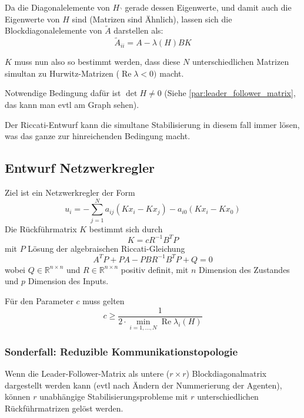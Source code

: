 Da die Diagonalelemente von $H_\urcorner$ gerade dessen Eigenwerte, und damit auch die
Eigenwerte von $H$ sind (Matrizen sind Ähnlich), lassen sich die Blockdiagonalelemente von
$\tilde{A}$ darstellen als:
\begin{equation}
    \tilde{A}_{ii} = A-\lambda(H)BK
\end{equation}

$K$ muss nun also so bestimmt werden, dass diese $N$ unterschiedlichen Matrizen simultan
zu Hurwitz-Matrizen ($\operatorname{Re}\lambda < 0)$ macht.

Notwendige Bedingung dafür ist $\det H \neq 0$ (Siehe \ref{par:leader_follower_matrix}, das
kann man evtl am Graph sehen).

Der Riccati-Entwurf kann die simultane Stabilisierung in diesem fall immer lösen,
was das ganze zur hinreichenden Bedingung macht.

\subsection{Entwurf Netzwerkregler}
\label{sec:lf_nw_regler_entwurf}
Ziel ist ein Netzwerkregler der Form
\begin{equation}
    u_i = -\sum_{j=1}^N a_{ij} (Kx_i - Kx_j) - a_{i0} (Kx_i - Kx_0)
\end{equation}
Die Rückführmatrix $K$ bestimmt sich durch
\begin{equation}
    K=c R^{-1} B^T P
\end{equation}
mit $P$ Lösung der algebraischen Riccati-Gleichung
\begin{equation}
    \tag{ARE}
    A^T P + P A - P B R^{-1} B^T P + Q = 0
\end{equation}
wobei $Q \in \mathbb{R}^{n\times n}$ und $R \in \mathbb{R}^{n\times n}$
positiv definit, mit $n$ Dimension des Zustandes und $p$ Dimension des
Inputs.

Für den Parameter $c$ muss gelten
\begin{equation}
    c \geq \frac{1}{2 \cdot \min_{i=1,\ldots,N} \operatorname{Re} \lambda_i(H)}
\end{equation}


\subsubsection{Sonderfall: Reduzible Kommunikationstopologie}
Wenn die Leader-Follower-Matrix als untere ($r\times r$) Blockdiagonalmatrix
dargestellt werden kann (evtl nach Ändern der Nummerierung der Agenten),
können $r$ unabhängige Stabilisierungsprobleme mit $r$ unterschiedlichen
Rückführmatrizen gelöst werden.

